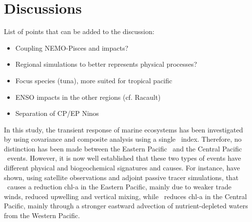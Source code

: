 \section{Discussions}

List of points that can be added to the discussion:

\begin{itemize}
    \item Coupling NEMO-Pisces and impacts?
    \item Regional simulations to better represents physical processes?
    \item Focus species (tuna), more suited for tropical pacific
    \item ENSO impacts in the other regions (cf. Racault)
    \item Separation of CP/EP Ninos
\end{itemize}

In this study, the transient response of marine ecosystems has been investigated by using covariance and composite analysis using a single \nino\ index.
Therefore, no distinction has been made between the Eastern Pacific \nino\ and the Central Pacific \nino\ events. However, it is now well established that these two types of events 
have different physical and biogeochemical signatures and causes. For instance, \cite{gierachBiologicalResponse19972012} have shown, using satellite observations and adjoint passive tracer simulations, 
that \epn\ causes a reduction chl-a in the Eastern Pacific, mainly due to weaker trade winds, reduced upwelling and vertical mixing, while \cpn\ reduces chl-a in the Central Pacific, mainly through a stronger
eastward advection of nutrient-depleted waters from the Western Pacific.


